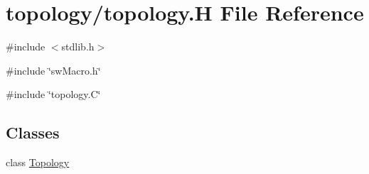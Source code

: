 \hypertarget{topology_8H}{
\section{topology/topology.H File Reference}
\label{topology_8H}
}
{\ttfamily \#include $<$stdlib.h$>$}\par
{\ttfamily \#include \char`\"{}swMacro.h\char`\"{}}\par
{\ttfamily \#include \char`\"{}topology.C\char`\"{}}\par
\subsection*{Classes}
\begin{DoxyCompactItemize}
\item 
class \hyperlink{classTopology}{Topology}
\end{DoxyCompactItemize}
